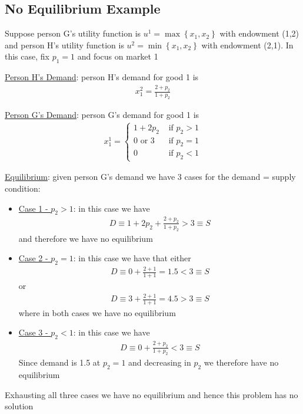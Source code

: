 \documentclass{article}
\begin{document}
\subsection{No Equilibrium Example}
Suppose person G's utility function is $u^{1} = \max \left\{ x_{1}, x_{2} \right\}$ with endowment (1,2) and person H's utility function is $u^{2} = \min \left\{ x_{1}, x_{2} \right\}$ with endowment (2,1). In this case, fix $p_{1} = 1$ and focus on market 1
\par \vspace{0.3em}
  \underline{Person H's Demand}: person H's demand for good 1 is
  \begin{gather*}
    x_{1}^{2} = \frac{2 + p_{2}}{1 + p_{2}}
  \end{gather*}
  \par
  \underline{Person G's Demand}: person G's demand for good 1 is
  \begin{gather*}
    x_{1}^{1} =
    \begin{cases}
       1 + 2p_{2} & \text{ if } p_{2} > 1 \\
       0 \text{ or } 3 & \text{ if } p_{2} = 1 \\
       0 & \text{ if } p_{2} < 1
    \end{cases}
  \end{gather*}
  \par
  \underline{Equilibrium}: given person G's demand we have 3 cases for the demand = supply condition:
  \begin{itemize}
    \item  \underline{Case 1 - $p_{2} > 1$}: in this case we have
    \begin{gather*}
      D \equiv 1 + 2p_{2} + \frac{2 + p_{2}}{1 + p_{2}} > 3 \equiv S
    \end{gather*}
    and therefore we have no equilibrium
    \item  \underline{Case 2 - $p_{2} = 1$}: in this case we have that either
    \begin{gather*}
      D \equiv 0 + \frac{2 + 1}{1 + 1} = 1.5 < 3 \equiv S
    \end{gather*}
    or
    \begin{gather*}
      D \equiv 3 + \frac{2 + 1}{1 + 1} = 4.5 > 3 \equiv S
    \end{gather*}
    where in both cases we have no equilibrium
    \item  \underline{Case 3 - $p_{2} < 1$}: in this case we have
    \begin{gather*}
      D \equiv 0 + \frac{2 + p_{2}}{1 + p_{2}} < 3 \equiv S
    \end{gather*}
    Since demand is 1.5 at $p_{2} = 1$ and decreasing in $p_{2}$ we therefore have no equilibrium
  \end{itemize}
  Exhausting all three cases we have no equilibrium and hence this problem has no solution
  \par
\vspace{6mm}
\end{document}
